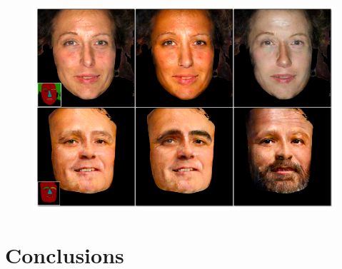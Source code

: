 \documentclass{beamer}
\begin{document}
\begin{frame}
\begin{figure}
	\centering
	\includegraphics[height=0.45\textheight]{images/result_4}
\end{figure}
\end{frame}

\section{Conclusions}
\end{document}
